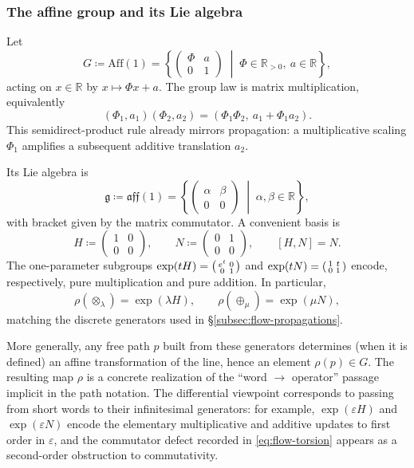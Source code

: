 \subsubsection*{The affine group and its Lie algebra}
Let
\[
G \coloneqq \mathrm{Aff}(1)
=\left\{
\begin{pmatrix}
\Phi & a\\
0 & 1
\end{pmatrix}
\;\middle|\; \Phi\in\mathbb{R}_{>0},\ a\in\mathbb{R}
\right\},
\]
acting on $x\in\mathbb{R}$ by $x\mapsto \Phi x + a$. The group law is matrix multiplication, equivalently
\[
(\Phi_1,a_1)(\Phi_2,a_2)=(\Phi_1\Phi_2,\ a_1+\Phi_1 a_2).
\]
This semidirect-product rule already mirrors propagation: a multiplicative scaling $\Phi_1$ amplifies a subsequent additive translation $a_2$.

Its Lie algebra is
\[
\mathfrak{g}\coloneqq \mathfrak{aff}(1)
=\left\{
\begin{pmatrix}
\alpha & \beta\\
0 & 0
\end{pmatrix}
\;\middle|\; \alpha,\beta\in\mathbb{R}
\right\},
\]
with bracket given by the matrix commutator. A convenient basis is
\[
H\coloneqq
\begin{pmatrix}
1 & 0\\
0 & 0
\end{pmatrix},
\qquad
N\coloneqq
\begin{pmatrix}
0 & 1\\
0 & 0
\end{pmatrix},
\qquad
[H,N]=N.
\]
The one-parameter subgroups $\exp(tH)=\begin{psmallmatrix}e^t&0\\0&1\end{psmallmatrix}$ and $\exp(tN)=\begin{psmallmatrix}1&t\\0&1\end{psmallmatrix}$ encode, respectively, pure multiplication and pure addition. In particular,
\[
\rho(\otimes_\lambda)=\exp(\lambda H),
\qquad
\rho(\oplus_\mu)=\exp(\mu N),
\]
matching the discrete generators used in \S\ref{subsec:flow-propagations}.

More generally, any free path $p$ built from these generators determines (when it is defined) an affine transformation of the line, hence an element $\rho(p)\in G$. The resulting map $\rho$ is a concrete realization of the ``word $\to$ operator'' passage implicit in the path notation. The differential viewpoint corresponds to passing from short words to their infinitesimal generators: for example, $\exp(\varepsilon H)$ and $\exp(\varepsilon N)$ encode the elementary multiplicative and additive updates to first order in $\varepsilon$, and the commutator defect recorded in \eqref{eq:flow-torsion} appears as a second-order obstruction to commutativity.

